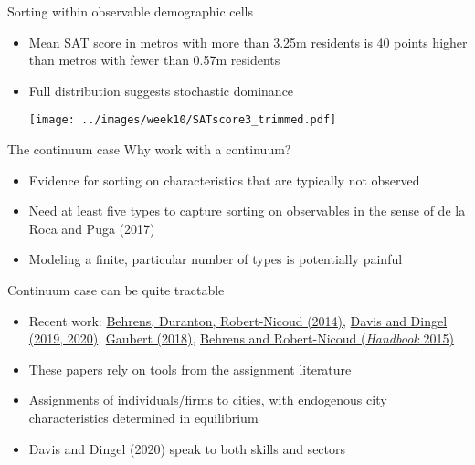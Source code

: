\documentclass[10pt,notes=hide]{beamer}
\begin{document}
\begin{frame}{Sorting within observable demographic cells}
\begin{itemize}
	\item Mean SAT score in metros with more than 3.25m residents is 40 points higher than metros with fewer than 0.57m residents
	\item Full distribution suggests stochastic dominance
	\begin{center}\texttt{[image: ../images/week10/SATscore3\_trimmed.pdf]}\end{center}
\end{itemize}
\end{frame}
\begin{frame}{The continuum case}
Why work with a continuum?
\begin{itemize}
	\item Evidence for sorting on characteristics that are typically not observed
	\item Need at least five types to capture sorting on observables in the sense of de la Roca and Puga (2017)
	\item Modeling a finite, particular number of types is potentially painful
\end{itemize}
Continuum case can be quite tractable
\begin{itemize}
	\item Recent work: \href{https://ideas.repec.org/a/ucp/jpolec/doi10.1086-675534.html}{Behrens, Duranton, Robert-Nicoud (2014)}, \href{http://faculty.chicagobooth.edu/jonathan.dingel/}{Davis and Dingel (2019, 2020)}, \href{https://www.aeaweb.org/articles?id=10.1257/aer.20150361}{Gaubert (2018)}, \href{http://www.sciencedirect.com/science/article/pii/B9780444595171000040}{Behrens and Robert-Nicoud (\emph{Handbook} 2015)}
	\item These papers rely on tools from the assignment literature
	\item Assignments of individuals/firms to cities, with endogenous city characteristics determined in equilibrium
	\item Davis and Dingel (2020) speak to both skills and sectors
\end{itemize}
\end{frame}
\end{document}
